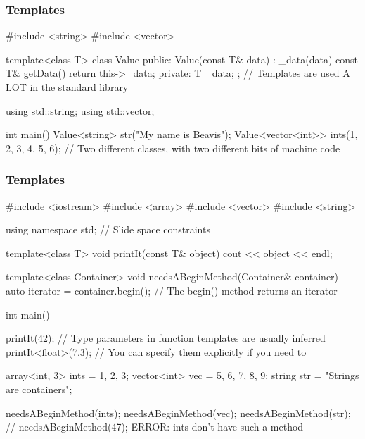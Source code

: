 \documentclass[glossy]{beamer}
\begin{document}
\begin{frame}[fragile=singleslide]
  \frametitle{Templates}
  \begin{cppcode}
#include <string>
#include <vector>

template<class T>
class Value {
  public:
    Value(const T& data) : _data(data) {}
    const T& getData() { return this->_data; }
  private:
    T _data;
};
// Templates are used A LOT in the standard library

using std::string; 
using std::vector; 

int main() { 
  Value<string> str("My name is Beavis");
  Value<vector<int>> ints({1, 2, 3, 4, 5, 6}); 
  // Two different classes, with two different bits of machine code 
}
  \end{cppcode}
\end{frame}

\begin{frame}[fragile=singleslide]
  \frametitle{Templates}
  \begin{cppcode}
#include <iostream>
#include <array> 
#include <vector> 
#include <string> 

using namespace std; // Slide space constraints 

template<class T> 
void printIt(const T& object) { 
  cout << object << endl; 
} 

template<class Container> 
void needsABeginMethod(Container& container) { 
  auto iterator = container.begin(); // The begin() method returns an iterator 
} 

int main() { 
  printIt(42); // Type parameters in function templates are usually inferred 
  printIt<float>(7.3); // You can specify them explicitly if you need to 

  array<int, 3> ints = {1, 2, 3}; 
  vector<int> vec = {5, 6, 7, 8, 9}; 
  string str = "Strings are containers"; 

  needsABeginMethod(ints); 
  needsABeginMethod(vec); 
  needsABeginMethod(str); 
  // needsABeginMethod(47); ERROR: ints don't have such a method 
}
  \end{cppcode}
\end{frame}
\end{document}
